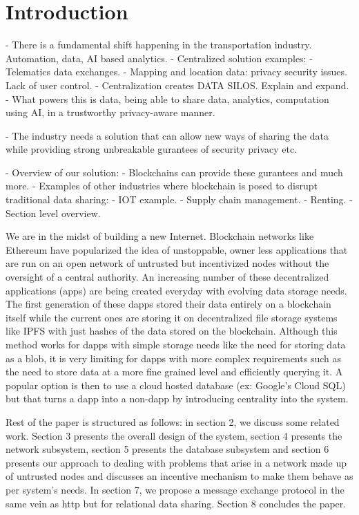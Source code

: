 \section{Introduction}\label{sec:intro}

- There is a fundamental shift happening in the transportation industry. Automation, data, AI based analytics.
- Centralized solution examples:
    - Telematics data exchanges.
    - Mapping and location data: privacy security issues. Lack of user control.
    - Centralization creates DATA SILOS. Explain and expand.
- What powers this is data, being able to share data, analytics, computation using AI, in a trustworthy privacy-aware
manner.

- The industry needs a solution that can allow new ways of sharing the data while providing strong unbreakable gurantees
of security privacy etc.


- Overview of our solution:
  - Blockchains can provide these gurantees and much more. 
  - Examples of other industries where blockchain is posed to disrupt traditional data sharing:
    - IOT example.
    - Supply chain management.
    - Renting.
  - Section level overview.



We are in the midst of building a new Internet. Blockchain networks like Ethereum have popularized the idea of unstoppable, owner less applications that are run on an open network of untrusted but incentivized nodes without the oversight of a central authority. An increasing number of these decentralized applications (\DJ apps) are being created everyday with evolving data storage needs. The first generation of these dapps stored their data entirely on a blockchain itself while the current ones are storing it on decentralized file storage systems like IPFS with just hashes of the data stored on the blockchain. Although this method works for dapps with simple storage needs like the need for storing data as a blob, it is very limiting for dapps with more complex requirements such as the need to store data at a more fine grained level and efficiently querying it. A popular option is then to use a cloud hosted database (ex: Google’s Cloud SQL) but that turns a dapp into a non-dapp by introducing centrality into the system. \newline\newline

Rest of the paper is structured as follows: in section 2, we discuss some related work. Section 3 presents the overall design of the system, section 4 presents the network subsystem, section 5 presents the database subsystem and section 6 presents our approach to dealing with problems that arise in a network made up of untrusted nodes and discusses an incentive mechanism to make them behave as per system's needs. In section 7, we propose a message exchange protocol in the same vein as http but for relational data sharing. Section 8 concludes the paper.


